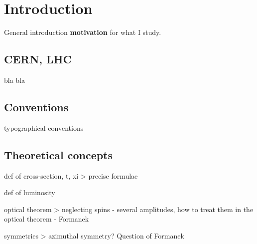 \chapter{Introduction}

\> General introduction
\> {\bf motivation} for what I study.

\section{CERN, LHC}

\> bla bla


\section{Conventions}

\> typographical conventions



\section{Theoretical concepts}

\> def of cross-section, t, xi
\>> precise formulae

\> def of luminosity

\> optical theorem
\>> neglecting spins - several amplitudes, how to treat them in the optical theorem - Formanek

\> symmetries
\>> azimuthal symmetry? Question of Formanek

